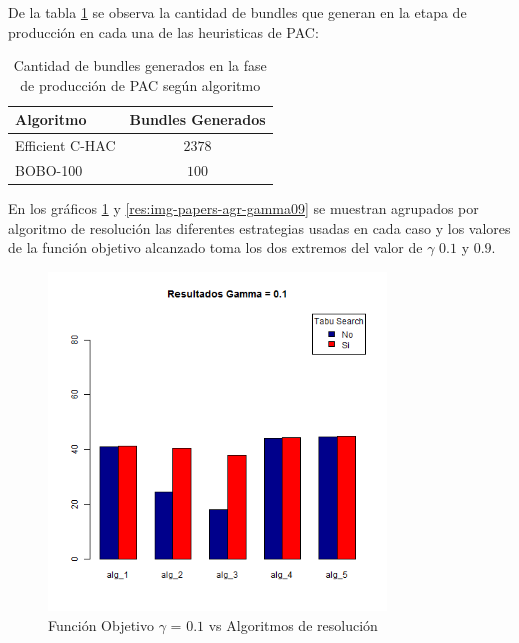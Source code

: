 De la tabla \ref{res:tbl-cant-bundles} se observa la cantidad de bundles que generan en la etapa de producción en cada una de las heuristicas de PAC:\\
\begin{table}[h]
  \centering
  \resizebox{0.5\textwidth}{!} {
    \begin{tabular}{|lc|}
    \hline
    Algoritmo & Bundles Generados \\
    \hline
    Efficient C-HAC & $2378$ \\
    BOBO-100 & $100$ \\
    \hline
    \end{tabular}
  }
    \caption {Cantidad de bundles generados en la fase de producción de PAC según algoritmo}
    \label{res:tbl-cant-bundles}
\end{table}
\newpage

En los gráficos \ref{res:img-papers-agr-gamma01} y \ref{res:img-papers-agr-gamma09} se muestran agrupados por algoritmo de resolución las diferentes estrategias usadas en cada caso y los valores de la función objetivo alcanzado toma los dos extremos del valor de $\gamma$ $0.1$ y $0.9$. 

\begin{figure}[H]
  \centering
    \includegraphics[width=0.8\textwidth]{resultados/papers/Graficos_agrupados/gamma01.png}
  \caption{Función Objetivo $\gamma$ = $0.1$ vs Algoritmos de resolución}
  \label{res:img-papers-agr-gamma01}
\end{figure}

